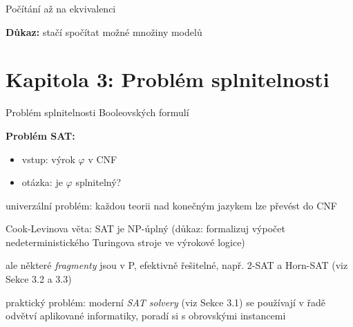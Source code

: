 \documentclass{beamer}
\begin{document}
\begin{frame}{Počítání až na ekvivalenci}


    \textbf{Důkaz:} stačí spočítat možné množiny modelů\hfill\qedsymbol
        
\end{frame}


\section{\sc Kapitola 3: Problém splnitelnosti}


\begin{frame}{Problém splnitelnosti Booleovských formulí}
   
\textbf{Problém SAT:}
\begin{itemize}
    \item vstup: výrok $\varphi$ v CNF
    \item otázka: je $\varphi$ splnitelný? 
\end{itemize}

\alert{univerzální problém}: každou teorii nad konečným jazykem lze převést do CNF

\alert{Cook-Levinova věta}: SAT je NP-úplný (důkaz: formalizuj výpočet nedeterministického Turingova stroje ve výrokové logice)

ale některé \emph{fragmenty} jsou v P, efektivně řešitelné, např. 2-SAT a Horn-SAT (viz Sekce 3.2 a 3.3)

\alert{praktický problém}: moderní \emph{SAT solvery} (viz Sekce 3.1) se používají v řadě odvětví aplikované informatiky, poradí si s obrovskými instancemi
    
\end{frame}
\end{document}
